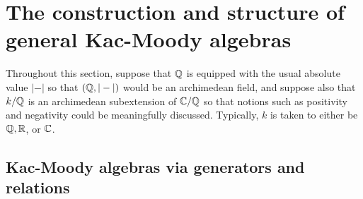 \section{The construction and structure of general Kac-Moody algebras}
    \begin{convention}
        Throughout this section, suppose that $\mathbb{Q}$ is equipped with the usual absolute value $|-|$ so that $(\mathbb{Q}, |-|)$ would be an archimedean field, and suppose also that $k/\mathbb{Q}$ is an archimedean subextension of $\mathbb{C}/\mathbb{Q}$ so that notions such as positivity and negativity could be meaningfully discussed. Typically, $k$ is taken to either be $\mathbb{Q}, \mathbb{R}$, or $\mathbb{C}$.
    \end{convention}

    \subsection{Kac-Moody algebras via generators and relations}
